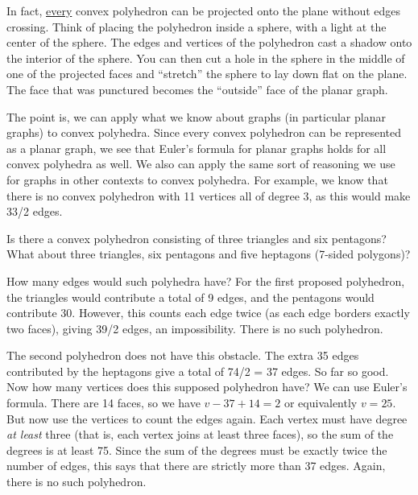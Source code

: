 \documentclass[12pt]{article}
\begin{document}
\begin{center}
\end{center}

In fact, \underline{every} convex polyhedron can be projected onto the plane without edges crossing.  Think of placing the polyhedron inside a sphere, with a light at the center of the sphere.  The edges and vertices of the polyhedron cast a shadow onto the interior of the sphere.  You can then cut a hole in the sphere in the middle of one of the projected faces and ``stretch'' the sphere to lay down flat on the plane.  The face that was punctured becomes the ``outside'' face of the planar graph.

The point is, we can apply what we know about graphs (in particular planar graphs) to convex polyhedra.  Since every convex polyhedron can be represented as a planar graph, we see that Euler's formula for planar graphs holds for all convex polyhedra as well.  We also can apply the same sort of reasoning we use for graphs in other contexts to convex polyhedra.  For example, we know that there is no convex polyhedron with 11 vertices all of degree 3, as this would make 33/2 edges.

\begin{example}
Is there a convex polyhedron consisting of three triangles and six pentagons?  What about three triangles, six pentagons and five heptagons (7-sided polygons)?

\begin{solution}
How many edges would such polyhedra have?  For the first proposed polyhedron, the triangles would contribute a total of 9 edges, and the pentagons would contribute 30.  However, this counts each edge twice (as each edge borders exactly two faces), giving 39/2 edges, an impossibility.  There is no such polyhedron.

The second polyhedron does not have this obstacle. The extra 35 edges contributed by the heptagons give a total of 74/2 = 37 edges.  So far so good.  Now how many vertices does this supposed polyhedron have?  We can use Euler's formula.  There are 14 faces, so we have $v - 37 + 14 = 2$ or equivalently $v = 25$.  But now use the vertices to count the edges again.  Each vertex must have degree \emph{at least} three (that is, each vertex joins at least three faces), so the sum of the degrees is at least 75.  Since the sum of the degrees must be exactly twice the number of edges, this says that there are strictly more than 37 edges.  Again, there is no such polyhedron.
\end{solution}
\end{example}
\end{document}
